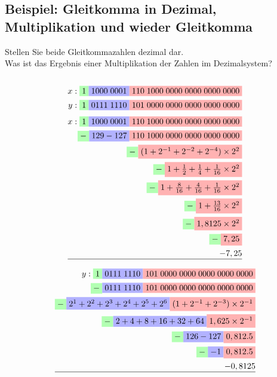 \documentclass[a4paper]{scrartcl}
\begin{document}
		\subsection{Beispiel: Gleitkomma in Dezimal, Multiplikation und wieder Gleitkomma}
			Stellen Sie beide Gleitkommazahlen dezimal dar.\\
			Was ist das Ergebnis einer Multiplikation der Zahlen im Dezimalsystem?\\
			\\
			\begin{align*}
			x: \colorbox{green!30}{$1$} \colorbox{blue!30}{$1000\;0001$} \colorbox{red!30}{$110\; 1000\; 0000\; 0000\; 0000\; 0000$}\\
			y: \colorbox{green!30}{$1$} \colorbox{blue!30}{$0111\;1110$} \colorbox{red!30}{$101\; 0000\; 0000\; 0000\; 0000\; 0000$}\\
			\end{align*}
			\begin{align*}
			x: \colorbox{green!30}{$1$} \colorbox{blue!30}{$1000\;0001$} \colorbox{red!30}{$110\; 1000\; 0000\; 0000\; 0000\; 0000$}\\
			\colorbox{green!30}{$-$} \colorbox{blue!30}{$129-127$} \colorbox{red!30}{$110\; 1000\; 0000\; 0000\; 0000\; 0000$}\\
			\colorbox{green!30}{$-$}  \colorbox{red!30}{$(1+2^{-1} + 2^{-2} + 2^{-4}) \times 2^2$}\\
			\colorbox{green!30}{$-$}  \colorbox{red!30}{$1+ \frac{1}{2} +  \frac{1}{4} +  \frac{1}{16} \times 2^{2}$}\\
			\colorbox{green!30}{$-$}  \colorbox{red!30}{$1+ \frac{8}{16} +  \frac{4}{16} +  \frac{1}{16} \times 2^{2}$}\\
			\colorbox{green!30}{$-$}  \colorbox{red!30}{$1+ \frac{13}{16} \times 2^{2}$}\\
			\colorbox{green!30}{$-$}  \colorbox{red!30}{$1,8125  \times 2^{2}$}\\
			\colorbox{green!30}{$-$}  \colorbox{red!30}{$ 7,25 $}\\
			-7,25\\ \hline
			\end{align*}
			
			\begin{align*}
			y:\colorbox{green!30}{$1$} \colorbox{blue!30}{$0111\;1110$} \colorbox{red!30}{$101\; 0000\; 0000\; 0000\; 0000\; 0000$}\\
			\colorbox{green!30}{$-$} \colorbox{blue!30}{$0111\;1110$} \colorbox{red!30}{$101\; 0000\; 0000\; 0000\; 0000\; 0000$}\\
			\colorbox{green!30}{$-$} \colorbox{blue!30}{$2^1 + 2^2  + 2^3 + 2^4 + 2^5 + 2^6$} \colorbox{red!30}{$(1 + 2^{-1} + 2^{-3}) \times 2^{-1}$}\\
			\colorbox{green!30}{$-$} \colorbox{blue!30}{$2 + 4 + 8 + 16 + 32 + 64$} \colorbox{red!30}{$1,625 \times 2^{-1}$}\\
			\colorbox{green!30}{$-$} \colorbox{blue!30}{$126-127$} \colorbox{red!30}{$0,812.5$}\\
			\colorbox{green!30}{$-$} \colorbox{blue!30}{$-1$} \colorbox{red!30}{$0,812.5$}\\
			-0,8125\\ \hline
			\end{align*}
			
\end{document}
